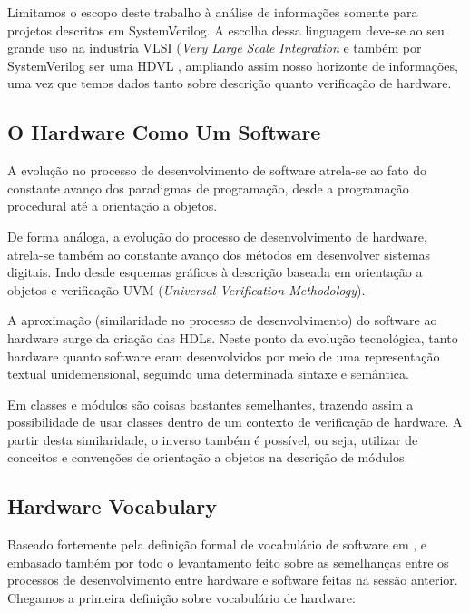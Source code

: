\documentclass[12pt, twocolumn, a4paper]{article}
\begin{document}
Limitamos o escopo deste trabalho à análise de informações somente para projetos descritos em SystemVerilog. A escolha dessa linguagem deve-se ao seu grande uso na industria VLSI (\textit{Very Large Scale Integration} \cite{Kumar2014} e também por SystemVerilog ser uma HDVL \cite{IEEEComputerSociety2013}, ampliando assim nosso horizonte de informações, uma vez que temos dados tanto sobre descrição quanto verificação de hardware.


	\subsection{O Hardware Como Um Software}
\quad A evolução no processo de desenvolvimento de software atrela-se ao fato do constante avanço dos paradigmas de programação, desde a programação procedural até a orientação a objetos.

De forma análoga, a evolução do processo de desenvolvimento de hardware, atrela-se também ao constante avanço dos métodos em desenvolver sistemas digitais. Indo desde esquemas gráficos à descrição baseada em orientação a objetos e verificação UVM (\textit{Universal Verification Methodology}).

A aproximação (similaridade no processo de desenvolvimento) do software ao hardware surge da criação das HDLs. Neste ponto da evolução tecnológica, tanto hardware quanto software eram desenvolvidos por meio de uma representação textual unidemensional, seguindo uma determinada sintaxe e semântica.

Em \cite{Hahanov2008} classes e módulos são coisas bastantes semelhantes, trazendo assim a possibilidade de usar classes dentro de um contexto de verificação de hardware. A partir desta similaridade, o inverso também é possível, ou seja, utilizar de conceitos e convenções de orientação a objetos na descrição de módulos.

	\subsection{Hardware Vocabulary} 
	
\quad Baseado fortemente pela definição formal de vocabulário de software em  \cite{Santos2015}, e embasado também por todo o levantamento feito sobre as semelhanças entre os processos de desenvolvimento entre hardware e software feitas na sessão anterior. Chegamos a primeira definição sobre vocabulário de hardware:
	
\end{document}
